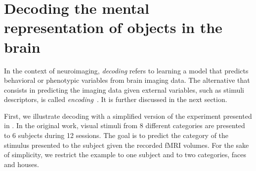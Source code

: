 \documentclass{frontiersSCNS} %
\newcommand{\alex}[1]{\todo[inline, color=green!40]{#1}}
\begin{document}


%




\section{Decoding the mental representation of objects in the brain}

In the context of neuroimaging, \textit{decoding} refers to learning a model
that predicts behavioral or phenotypic variables from brain imaging data. 
The alternative that consists in predicting the imaging data given external
variables, such as stimuli descriptors, is 
called \textit{encoding}~\citep{naselaris2011}. It is further discussed in the next 
section.

First, we illustrate decoding with a simplified version of the experiment presented in
\cite{haxby2001}. In the original work, visual stimuli from 8 different categories
are presented to 6 subjects during 12 sessions. The goal is to 
predict the category of the stimulus presented to the subject given the
recorded fMRI volumes. For the sake of simplicity, we restrict the example
to one subject and to two categories, faces and houses.
\end{document}
